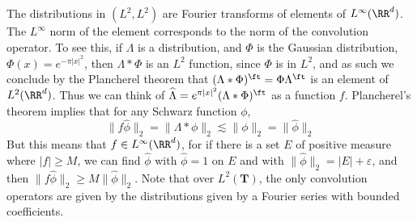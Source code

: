 \begin{example}
	The distributions in $(L^2, L^2)$ are Fourier transforms of elements of $L^\infty(\RR^d)$. The $L^\infty$ norm of the element corresponds to the norm of the convolution operator. To see this, if $\Lambda$ is a distribution, and $\Phi$ is the Gaussian distribution, $\Phi(x) = e^{-\pi|x|^2}$, then $\Lambda * \Phi$ is an $L^2$ function, since $\Phi$ is in $L^2$, and as such we conclude by the Plancherel theorem that $(\Lambda * \Phi)^\ft = \Phi \Lambda^\ft$ is an element of $L^2(\RR^d)$. Thus we can think of $\widehat{\Lambda} = e^{\pi |x|^2} (\Lambda * \Phi)^\ft$ as a function $f$. Plancherel's theorem implies that for any Schwarz function $\phi$,
	\[ \| f \widehat{\phi} \|_2 = \| \Lambda * \phi \|_2 \lesssim \| \phi \|_2 = \| \widehat{\phi} \|_2 \]
	But this means that $f \in L^\infty(\RR^d)$, for if there is a set $E$ of positive measure where $|f| \geq M$, we can find $\widehat{\phi}$ with $\widehat{\phi} = 1$ on $E$ and with $\| \widehat{\phi} \|_2 = |E| + \varepsilon$, and then $\| f \widehat{\phi} \|_2 \geq M \| \widehat{\phi} \|_2$. Note that over $L^2(\mathbf{T})$, the only convolution operators are given by the distributions given by a Fourier series with bounded coefficients.
\end{example}

